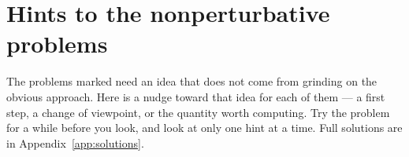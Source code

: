 \chapter{Hints to the nonperturbative problems}
\label{app:hints}

The problems marked  need an idea that does not come from grinding on the obvious approach. Here is a nudge toward that idea for each of them --- a first step, a change of viewpoint, or the quantity worth computing. Try the problem for a while before you look, and look at only one hint at a time. Full solutions are in Appendix~\ref{app:solutions}.

